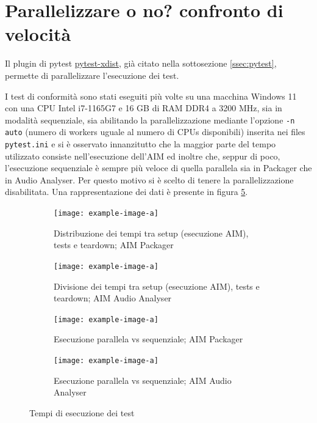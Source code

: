 \section{Parallelizzare o no? confronto di velocità} \label{sec:parallelizzazione}
Il plugin di pytest \href{https://pytest-xdist.readthedocs.io/}{pytest-xdist}, già citato nella sottosezione \ref{ssec:pytest}, permette di parallelizzare l'esecuzione dei test.

I test di conformità sono stati eseguiti più volte su una macchina Windows 11 con una CPU Intel i7-1165G7 e 16 GB di RAM DDR4 a 3200 MHz, sia in modalità sequenziale, sia abilitando la parallelizzazione mediante l'opzione \texttt{-n auto} (numero di workers uguale al numero di CPUs disponibili) inserita nei files \texttt{pytest.ini} e si è osservato innanzitutto che la maggior parte del tempo utilizzato consiste nell'esecuzione dell'\ac{AIM} ed inoltre che, seppur di poco, l'esecuzione sequenziale è sempre più veloce di quella parallela sia in Packager che in Audio Analyser. Per questo motivo si è scelto di tenere la parallelizzazione disabilitata.
Una rappresentazione dei dati è presente in figura \ref{fig:test-grafici-tempo}.
\begin{figure}[h]
     \centering
     \begin{subfigure}{0.45\textwidth}
         \centering
         \texttt{[image: example-image-a]}
         \caption{Distribuzione dei tempi tra setup (esecuzione \ac{AIM}), tests e teardown; \ac{AIM} Packager}
         \label{fig:grafico-distribuzione-tempo-packager}
     \end{subfigure}
     \hfill
     \begin{subfigure}{0.45\textwidth}
         \centering
         \texttt{[image: example-image-a]}
         \caption{Divisione dei tempi tra setup (esecuzione \ac{AIM}), tests e teardown; \ac{AIM} Audio Analyser}
         \label{fig:grafico-distribuzione-tempo-audioanalyser}
     \end{subfigure}
     \par\bigskip
     \begin{subfigure}{0.45\textwidth}
         \centering
         \texttt{[image: example-image-a]}
         \caption{Esecuzione parallela vs sequenziale; \ac{AIM} Packager}
         \label{fig:grafico-parallelo-vs-sequenziale-packager}
     \end{subfigure}
     \hfill
     \begin{subfigure}{0.45\textwidth}
         \centering
         \texttt{[image: example-image-a]}
         \caption{Esecuzione parallela vs sequenziale; \ac{AIM} Audio Analyser}
         \label{fig:grafico-parallelo-vs-sequenziale-audioanalyser}
     \end{subfigure}
        \caption{Tempi di esecuzione dei test}
        \label{fig:test-grafici-tempo}
\end{figure}



